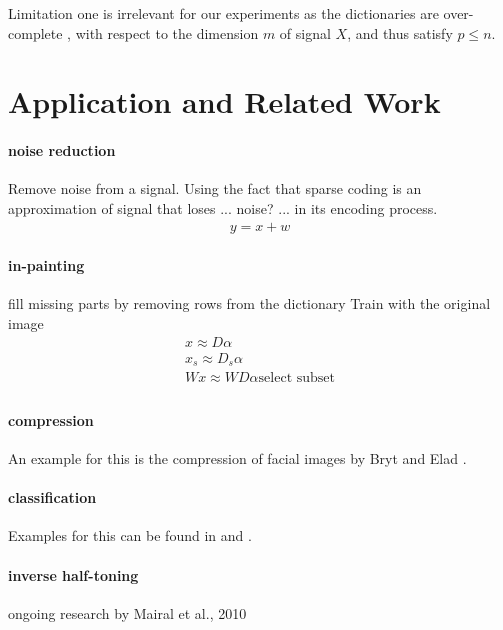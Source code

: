 Limitation one is irrelevant for our experiments as the dictionaries are over-complete 
, with respect to the dimension $m$ of signal $X$, and thus satisfy $p\leq n$.

\section{Application and Related Work}

\paragraph{noise reduction}
Remove noise from a signal. 
Using the fact that sparse coding is an approximation of signal that loses ... noise? ... in its encoding process. 
\begin{align*}
y = x + w
\end{align*}



\cite{Elad2006}

\paragraph{in-painting}
fill missing parts by removing rows from the dictionary
Train with the original image
\begin{align*}
x \approx D\alpha\\
x_s \approx D_s\alpha\\
Wx \approx WD\alpha\text{select subset}\\
\end{align*}

\cite{mairal08sparse}

\paragraph{compression} An example for this is the compression of facial images by Bryt and Elad \cite{Bryt2008}.

\paragraph{classification} Examples for this can be found in \cite{Mairal2008b} and \cite{Bar2009}.
\paragraph{inverse half-toning} ongoing research by Mairal et al., 2010 \cite{Mairal2010b}
